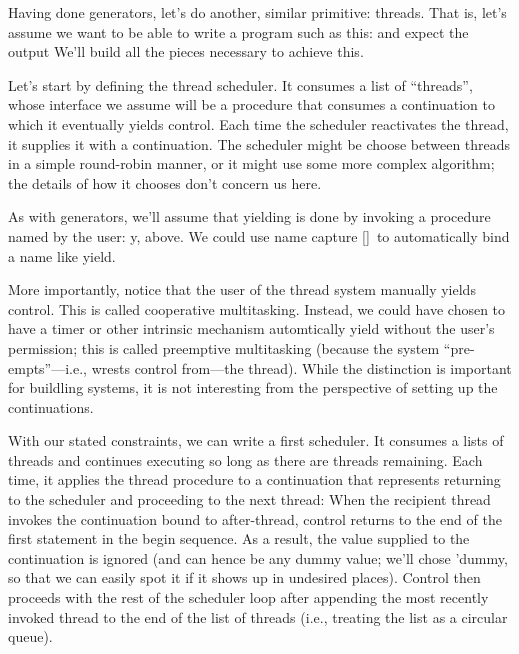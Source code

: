 
Having done generators, let’s do another, similar primitive: threads. That is,
let’s assume we want to be able to write a program such as this:
and expect the output
We’ll build all the pieces necessary to achieve this.

Let’s start by defining the thread scheduler. It consumes a list of “threads”,
whose interface we assume will be a procedure that consumes a continuation to
which it eventually yields control. Each time the scheduler reactivates the
thread, it supplies it with a continuation. The scheduler might be choose
between threads in a simple round-robin manner, or it might use some more
complex algorithm; the details of how it chooses don’t concern us here.

As with generators, we’ll assume that yielding is done by invoking a procedure
named by the user: y, above. We could use name capture \ref{}\ to automatically
bind a name like yield.

More importantly, notice that the user of the thread system manually yields
control. This is called cooperative multitasking. Instead, we could have chosen
to have a timer or other intrinsic mechanism automtically yield without the
user’s permission; this is called preemptive multitasking (because the system
“pre-empts”—i.e., wrests control from—the thread). While the distinction is
important for buildling systems, it is not interesting from the perspective of
setting up the continuations.


With our stated constraints, we can write a first scheduler. It consumes a lists
of threads and continues executing so long as there are threads remaining. Each
time, it applies the thread procedure to a continuation that represents
returning to the scheduler and proceeding to the next thread:
When the recipient thread invokes the continuation bound to after-thread,
control returns to the end of the first statement in the begin sequence. As a
result, the value supplied to the continuation is ignored (and can hence be any
dummy value; we’ll chose 'dummy, so that we can easily spot it if it shows up in
undesired places). Control then proceeds with the rest of the scheduler loop
after appending the most recently invoked thread to the end of the list of
threads (i.e., treating the list as a circular queue).

